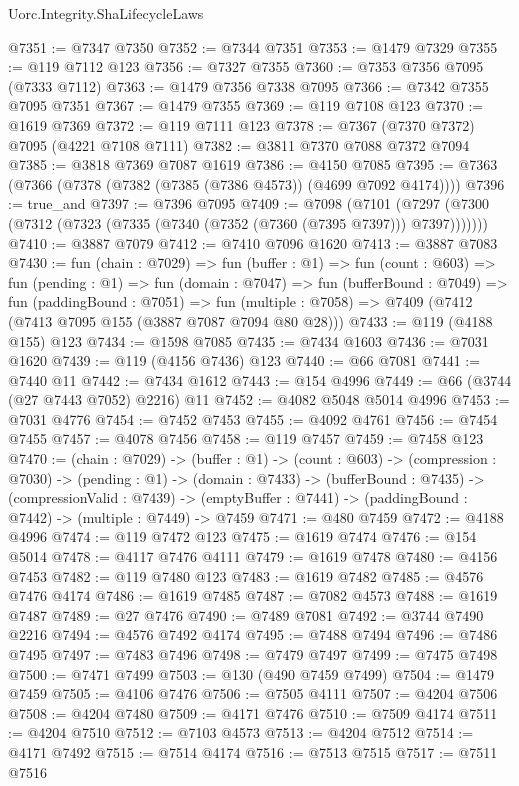 \begin{lexlean}{Uorc.Integrity.ShaLifecycleLaws}
\begin{coremodule}
@7351 := @7347 @7350
@7352 := @7344 @7351
@7353 := @1479 @7329
@7355 := @119 @7112 @123
@7356 := @7327 @7355
@7360 := @7353 @7356 @7095 (@7333 @7112)
@7363 := @1479 @7356 @7338 @7095
@7366 := @7342 @7355 @7095 @7351
@7367 := @1479 @7355
@7369 := @119 @7108 @123
@7370 := @1619 @7369
@7372 := @119 @7111 @123
@7378 := @7367 (@7370 @7372) @7095 (@4221 @7108 @7111)
@7382 := @3811 @7370 @7088 @7372 @7094
@7385 := @3818 @7369 @7087 @1619
@7386 := @4150 @7085
@7395 := @7363 (@7366 (@7378 (@7382 (@7385 (@7386 @4573)) (@4699 @7092 @4174))))
@7396 := true_and
@7397 := @7396 @7095
@7409 := @7098
    (@7101 (@7297 (@7300 (@7312 (@7323 (@7335 (@7340 (@7352 (@7360 (@7395 @7397))) @7397)))))))
@7410 := @3887 @7079
@7412 := @7410 @7096 @1620
@7413 := @3887 @7083
@7430 := fun (chain : @7029) =>
  fun (buffer : @1) =>
  fun (count : @603) =>
  fun (pending : @1) =>
  fun (domain : @7047) =>
  fun (bufferBound : @7049) =>
  fun (paddingBound : @7051) =>
  fun (multiple : @7058) => @7409 (@7412 (@7413 @7095 @155 (@3887 @7087 @7094 @80 @28)))
@7433 := @119 (@4188 @155) @123
@7434 := @1598 @7085
@7435 := @7434 @1603
@7436 := @7031 @1620
@7439 := @119 (@4156 @7436) @123
@7440 := @66 @7081
@7441 := @7440 @11
@7442 := @7434 @1612
@7443 := @154 @4996
@7449 := @66 (@3744 (@27 @7443 @7052) @2216) @11
@7452 := @4082 @5048 @5014 @4996
@7453 := @7031 @4776
@7454 := @7452 @7453
@7455 := @4092 @4761
@7456 := @7454 @7455
@7457 := @4078 @7456
@7458 := @119 @7457
@7459 := @7458 @123
@7470 := (chain : @7029) ->
  (buffer : @1) ->
  (count : @603) ->
  (compression : @7030) ->
  (pending : @1) ->
  (domain : @7433) ->
  (bufferBound : @7435) ->
  (compressionValid : @7439) ->
  (emptyBuffer : @7441) -> (paddingBound : @7442) -> (multiple : @7449) -> @7459
@7471 := @480 @7459
@7472 := @4188 @4996
@7474 := @119 @7472 @123
@7475 := @1619 @7474
@7476 := @154 @5014
@7478 := @4117 @7476 @4111
@7479 := @1619 @7478
@7480 := @4156 @7453
@7482 := @119 @7480 @123
@7483 := @1619 @7482
@7485 := @4576 @7476 @4174
@7486 := @1619 @7485
@7487 := @7082 @4573
@7488 := @1619 @7487
@7489 := @27 @7476
@7490 := @7489 @7081
@7492 := @3744 @7490 @2216
@7494 := @4576 @7492 @4174
@7495 := @7488 @7494
@7496 := @7486 @7495
@7497 := @7483 @7496
@7498 := @7479 @7497
@7499 := @7475 @7498
@7500 := @7471 @7499
@7503 := @130 (@490 @7459 @7499)
@7504 := @1479 @7459
@7505 := @4106 @7476
@7506 := @7505 @4111
@7507 := @4204 @7506
@7508 := @4204 @7480
@7509 := @4171 @7476
@7510 := @7509 @4174
@7511 := @4204 @7510
@7512 := @7103 @4573
@7513 := @4204 @7512
@7514 := @4171 @7492
@7515 := @7514 @4174
@7516 := @7513 @7515
@7517 := @7511 @7516

\end{coremodule}
\end{lexlean}

